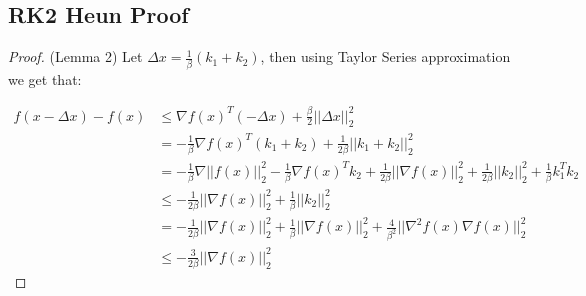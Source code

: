 \subsection{RK2 Heun Proof}
\begin{proof}(Lemma 2)
Let $\Delta x = \frac{1}{\beta}(k_1 + k_2) $, then using Taylor Series approximation we get that:

\begin{equation}
\begin{aligned}
f(x - \Delta x) - f(x) &\leq \nabla f(x)^T ( - \Delta x) + \frac{\beta}{2}|| \Delta x||_2^2 \\
& = - \frac{1}{\beta}\nabla f(x)^T (k_1 + k_2) + \frac{1}{2\beta}||k_1 + k_2 ||_2^2 \\
& = - \frac{1}{\beta}\nabla ||f(x)||_2^2 - \frac{1}{\beta}\nabla f(x)^T k_2 + \frac{1}{2\beta}||\nabla f(x)||_2^2 + \frac{1}{2\beta}||k_2||_2^2 + \frac{1}{\beta}k_1^T k_2 \\
& \leq -\frac{1}{2\beta}||\nabla f(x)||_2^2 + \frac{1}{\beta}||k_2||_2^2 \\
& = -\frac{1}{2\beta}||\nabla f(x)||_2^2 + \frac{1}{\beta}||\nabla f(x)||_2^2 + \frac{4}{\beta^2}||\nabla^2 f(x) \nabla f(x)||_2^2 \\
& \leq - \frac{3}{2\beta}|| \nabla f(x)||_2^2
\end{aligned}
\end{equation}

\end{proof}


